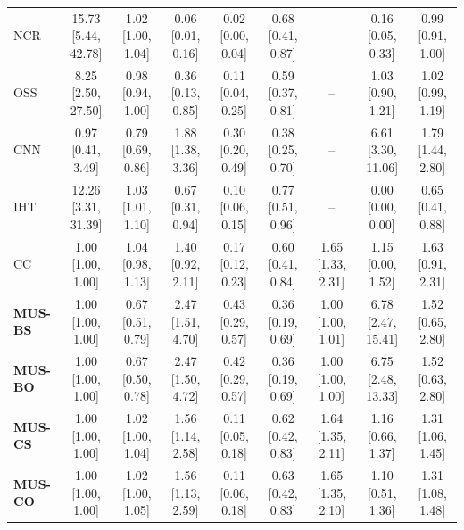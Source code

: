 \begin{table}[t]
{\begin{tabular}{lcccccccc}
NCR & 15.73 [5.44, 42.78] & 1.02 [1.00, 1.04] & 0.06 [0.01, 0.16] & 0.02 [0.00, 0.04] & 0.68 [0.41, 0.87] & -- & 0.16 [0.05, 0.33] & 0.99 [0.91, 1.00] \\
OSS & 8.25 [2.50, 27.50] & 0.98 [0.94, 1.00] & 0.36 [0.13, 0.85] & 0.11 [0.04, 0.25] & 0.59 [0.37, 0.81] & -- & 1.03 [0.90, 1.21] & 1.02 [0.99, 1.19] \\
CNN & 0.97 [0.41, 3.49] & 0.79 [0.69, 0.86] & 1.88 [1.38, 3.36] & 0.30 [0.20, 0.49] & 0.38 [0.25, 0.70] & -- & 6.61 [3.30, 11.06] & 1.79 [1.44, 2.80] \\
IHT & 12.26 [3.31, 31.39] & 1.03 [1.01, 1.10] & 0.67 [0.31, 0.94] & 0.10 [0.06, 0.15] & 0.77 [0.51, 0.96] & -- & 0.00 [0.00, 0.00] & 0.65 [0.41, 0.88] \\
\addlinespace
CC & 1.00 [1.00, 1.00] & 1.04 [0.98, 1.13] & 1.40 [0.92, 2.11] & 0.17 [0.12, 0.23] & 0.60 [0.41, 0.84] & 1.65 [1.33, 2.31] & 1.15 [0.00, 1.52] & 1.63 [0.91, 2.31] \\
\addlinespace
\textbf{MUS-BS} & 1.00 [1.00, 1.00] & 0.67 [0.51, 0.79] & 2.47 [1.51, 4.70] & 0.43 [0.29, 0.57] & 0.36 [0.19, 0.69] & 1.00 [1.00, 1.01] & 6.78 [2.47, 15.41] & 1.52 [0.65, 2.80] \\
\textbf{MUS-BO} & 1.00 [1.00, 1.00] & 0.67 [0.50, 0.78] & 2.47 [1.50, 4.72] & 0.42 [0.29, 0.57] & 0.36 [0.19, 0.69] & 1.00 [1.00, 1.00] & 6.75 [2.48, 13.33] & 1.52 [0.63, 2.80] \\
\textbf{MUS-CS} & 1.00 [1.00, 1.00] & 1.02 [1.00, 1.04] & 1.56 [1.14, 2.58] & 0.11 [0.05, 0.18] & 0.62 [0.42, 0.83] & 1.64 [1.35, 2.11] & 1.16 [0.66, 1.37] & 1.31 [1.06, 1.45] \\
\textbf{MUS-CO} & 1.00 [1.00, 1.00] & 1.02 [1.00, 1.05] & 1.56 [1.13, 2.59] & 0.11 [0.06, 0.18] & 0.63 [0.42, 0.83] & 1.65 [1.35, 2.10] & 1.10 [0.51, 1.36] & 1.31 [1.08, 1.48] \\
\bottomrule
\end{tabular}}
\end{table}
